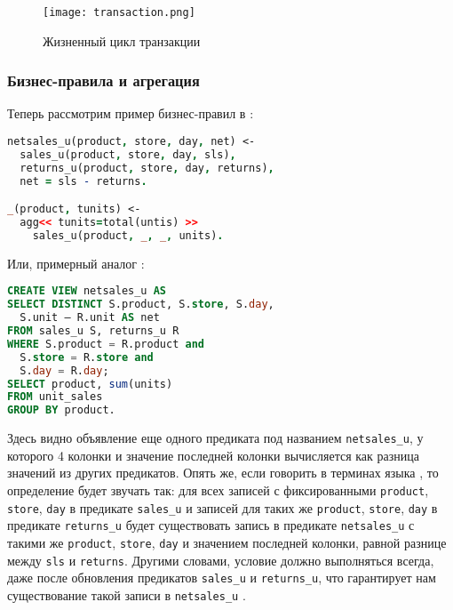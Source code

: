 \begin{landscape}
  \begin{figure}
  	\centering
  	\texttt{[image: transaction.png]}
  	\caption{Жизненный цикл транзакции}
  	\label{fig:technology:logiql:transaction}
  \end{figure}
\end{landscape}

\subsubsection{Бизнес-правила и агрегация}
\label{sec:technology:logiql:aggregations}

Теперь рассмотрим пример бизнес-правил в \logiql:

\begin{lstlisting}[language=Prolog]
netsales_u(product, store, day, net) <-
  sales_u(product, store, day, sls),
  returns_u(product, store, day, returns),
  net = sls - returns.

_(product, tunits) <-
  agg<< tunits=total(untis) >>
    sales_u(product, _, _, units).
\end{lstlisting}

Или, примерный аналог \sql:

\begin{lstlisting}[language=SQL]
CREATE VIEW netsales_u AS
SELECT DISTINCT S.product, S.store, S.day,
  S.unit – R.unit AS net
FROM sales_u S, returns_u R
WHERE S.product = R.product and
  S.store = R.store and
  S.day = R.day;
SELECT product, sum(units)
FROM unit_sales
GROUP BY product.
\end{lstlisting}

Здесь видно объявление еще одного предиката под названием \lstinline{netsales_u}, у которого 4 колонки и значение последней колонки вычисляется как разница значений из других предикатов. Опять же, если говорить в терминах языка \logiql, то определение будет звучать так: для всех записей с фиксированными \lstinline{product}, \lstinline{store}, \lstinline{day} в предикате \lstinline{sales_u} и записей для таких же \lstinline{product}, \lstinline{store}, \lstinline{day} в предикате \lstinline{returns_u} будет существовать запись в предикате \lstinline{netsales_u} с такими же \lstinline{product}, \lstinline{store}, \lstinline{day} и значением последней колонки, равной разнице между \lstinline{sls} и \lstinline{returns}. Другими словами, условие должно выполняться всегда, даже после обновления предикатов \lstinline{sales_u} и \lstinline{returns_u}, что гарантирует нам существование такой записи в \lstinline{netsales_u} \cite{query_language_for_smart_db}.

